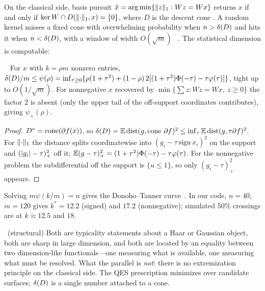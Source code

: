 On the classical side, basis pursuit $\hat x=\arg\min\{\lVert z\rVert_1:Wz=Wx\}$ returns $x$ if and only if
$\ker W\cap D(\lVert \cdot\rVert_1,x)=\{0\}$, where $D$ is the descent cone \proved. A random kernel misses a fixed cone with
overwhelming probability when $n>\delta(D)$ and hits it when $n<\delta(D)$, with a window of width
$O(\sqrt m)$~\cite{ALMT} \cited. The statistical dimension is computable:
\begin{proposition}\label{prop:sdim}\proved\ \numchk
For $x$ with $k=\rho m$ nonzero entries,
$\delta(D)/m\le\psi(\rho)=\inf_{\tau\ge0}\{\rho(1+\tau^2)+(1-\rho)\,2[(1+\tau^2)\Phi(-\tau)-\tau\varphi(\tau)]\}$,
tight up to $O(1/\sqrt m)$. For nonnegative $x$ recovered by $\min\{\sum z: Wz=Wx,\ z\ge0\}$ the factor $2$ is
absent (only the upper tail of the off-support coordinates contributes), giving $\psi_+(\rho)$.
\end{proposition}
\begin{proof}
$D^\circ=\operatorname{cone}(\partial f(x))$, so $\delta(D)=\mathbb E\,\mathrm{dist}(g,\operatorname{cone}\,\partial f)^2\le\inf_\tau\mathbb E\,\mathrm{dist}(g,\tau\partial f)^2$.
For $\lVert \cdot\rVert_1$ the distance splits coordinatewise into $(g_i-\tau\,\mathrm{sign}\,x_i)^2$ on the support and
$(\lvert g_i\rvert-\tau)_+^2$ off it; $\mathbb E(g-\tau)_+^2=(1+\tau^2)\Phi(-\tau)-\tau\varphi(\tau)$. For the nonnegative problem the
subdifferential off the support is $\{u\le1\}$, so only $(g_i-\tau)_+^2$ appears.
\end{proof}
Solving $m\psi(k/m)=n$ gives the Donoho--Tanner curve~\cite{DT}. In our code, $n=40$, $m=120$ gives $k^*=12.2$
(signed) and $17.2$ (nonnegative); simulated 50\% crossings are at $k\approx12.5$ and $18$.

\begin{entry}\analogy\ (structural)
Both are typicality statements about a Haar or Gaussian object, both are sharp in large dimension, and both are
located by an equality between two dimension-like functionals---one measuring what is available, one measuring what
must be resolved. What the parallel is \emph{not}: there is no extremization principle on the classical side.
The QES prescription minimizes over candidate surfaces; $\delta(D)$ is a single number attached to a cone.
\end{entry}

